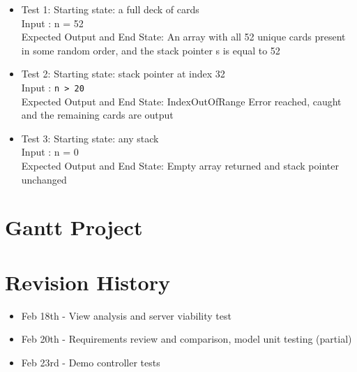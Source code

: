 \documentclass{article}
\begin{document}
\begin{itemize}
    \item Test 1: Starting state: a full deck of cards\\
    Input : n = 52\\
    Expected Output and End State: An array with all 52 unique cards present in some random order, and the stack pointer s is equal to 52
    \item Test 2: Starting state: stack pointer at index 32\\
    Input : \verb|n > 20|\\
    Expected Output and End State: IndexOutOfRange Error reached, caught and the remaining cards are output
    \item Test 3: Starting state: any stack\\
    Input : n = 0\\
    Expected Output and End State: Empty array returned and stack pointer unchanged
\end{itemize}

\section{Gantt Project}



\section{Revision History}

\begin{itemize}
    \item Feb 18th - View analysis and server viability test
    \item Feb 20th - Requirements review and comparison, model unit testing (partial)
    \item Feb 23rd - Demo controller tests
\end{itemize}
\end{document}
